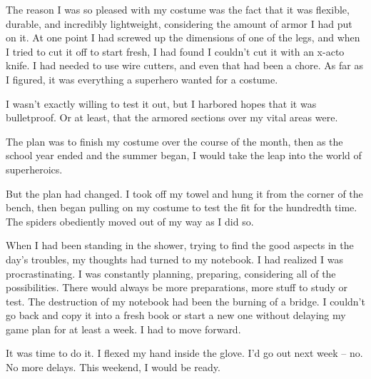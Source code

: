 The reason I was so pleased with my costume was the fact that it was flexible, durable, and incredibly lightweight, considering the amount of armor I had put on it.  At one point I had screwed up the dimensions of one of the legs, and when I tried to cut it off to start fresh, I had found I couldn't cut it with an x-acto knife.  I had needed to use wire cutters, and even that had been a chore.  As far as I figured, it was everything a superhero wanted for a costume.



I wasn't exactly willing to test it out, but I harbored hopes that it was bulletproof.  Or at least, that the armored sections over my vital areas were.



The plan was to finish my costume over the course of the month, then as the school year ended and the summer began, I would take the leap into the world of superheroics.



But the plan had changed.  I took off my towel and hung it from the corner of the bench, then began pulling on my costume to test the fit for the hundredth time.  The spiders obediently moved out of my way as I did so.



When I had been standing in the shower, trying to find the good aspects in the day's troubles, my thoughts had turned to my notebook.  I had realized I was procrastinating.  I was constantly planning, preparing, considering all of the possibilities.  There would always be more preparations, more stuff to study or test.  The destruction of my notebook had been the burning of a bridge.  I couldn't go back and copy it into a fresh book or start a new one without delaying my game plan for at least a week.  I had to move forward.



It was time to do it.  I flexed my hand inside the glove.  I'd go out next week – no.  No more delays.  This weekend, I would be ready.





